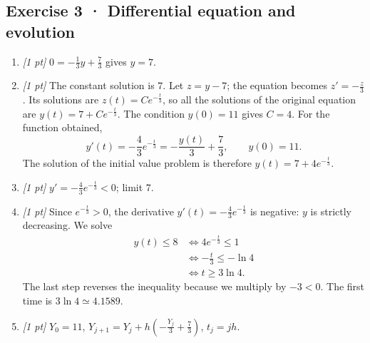 \subsection*{Exercise 3 · Differential equation and evolution}\begin{enumerate}

\item \textit{[1 pt]} $0=-\frac{1}{3}y+\frac{7}{3}$ gives $y=7$.

\item \textit{[1 pt]} The constant solution is $7$. Let $z=y-7$; the equation becomes $z'=-\frac{z}{3}$. Its solutions are $z(t)=Ce^{-\frac{t}{3}}$, so all the solutions of the original equation are $y(t)=7+Ce^{-\frac{t}{3}}$.
The condition $y(0)=11$ gives $C=4$. For the function obtained,
\[y'(t)=-\frac{4}{3}e^{-\frac{t}{3}}=-\frac{y(t)}{3}+\frac{7}{3},\qquad y(0)=11.\]
The solution of the initial value problem is therefore $y(t)=7+4e^{-\frac{t}{3}}$.

\item \textit{[1 pt]} $y'=-\frac{4}{3}e^{-\frac{t}{3}}<0$; limit $7$.

\item \textit{[1 pt]} Since $e^{-\frac{t}{3}}>0$, the derivative $y'(t)=-\frac{4}{3}e^{-\frac{t}{3}}$ is negative: $y$ is strictly decreasing. We solve
\[\begin{aligned}y(t)\le 8&\Longleftrightarrow 4e^{-\frac{t}{3}}\le1\\&\Longleftrightarrow -\frac{t}{3}\le-\ln 4\\&\Longleftrightarrow t\ge 3\ln 4.\end{aligned}\]
The last step reverses the inequality because we multiply by $-3<0$. The first time is $3\ln 4\simeq4.1589$.

\item \textit{[1 pt]} $Y_0=11$, $Y_{j+1}=Y_j+h(-\frac{Y_j}{3}+\frac{7}{3})$, $t_j=jh$.

\end{enumerate}

